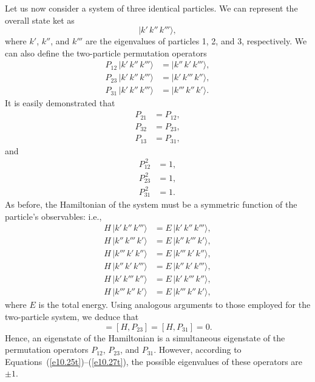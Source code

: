 Let us now consider a  system of three identical particles. We can represent the overall state ket as
\begin{equation}
|k'\,k''\,k'''\rangle,
\end{equation}
where $k'$, $k''$, and $k'''$ are the eigenvalues of particles 1, 2, and 3, respectively. We can also
define the two-particle permutation operators
\begin{align}
P_{12}\,|k'\,k''\,k'''\rangle &= |k''\,k'\,k'''\rangle,\\[0.5ex]
P_{23}\,|k'\,k''\,k'''\rangle &= |k'\,k'''\,k''\rangle,\\[0.5ex]
P_{31}\,|k'\,k''\,k'''\rangle &= |k'''\,k''\,k'\rangle.
\end{align}
It is easily demonstrated that
\begin{align}
P_{21}&= P_{12},\\[0.5ex]
P_{32}&= P_{23},\\[0.5ex]
P_{13}&= P_{31},
\end{align}
and
\begin{align}\label{e10.25t}
P_{12}^{\,2} &= 1,\\[0.5ex]
P_{23}^{\,2} &= 1,\\[0.5ex]
P_{31}^{\,2} &= 1.\label{e10.27t}
\end{align}
As before, the Hamiltonian of the system must be a symmetric function of the particle's observables: i.e.,
\begin{align}\label{e10.28t}
H\,|k'\,k''\,k'''\rangle &= E\,|k'\,k''\,k'''\rangle,\\[0.5ex]
H\,|k''\,k'''\,k'\rangle &= E\,|k''\,k'''\,k'\rangle,\\[0.5ex]
H\,|k'''\,k'\,k''\rangle &= E\,|k'''\,k'\,k''\rangle,\\[0.5ex]
H\,|k''\,k'\,k'''\rangle &= E\,|k''\,k'\,k'''\rangle,\\[0.5ex]
H\,|k'\,k'''\,k''\rangle &= E\,|k'\,k'''\,k''\rangle,\\[0.5ex]
H\,|k'''\,k''\,k'\rangle &= E\,|k'''\,k''\,k'\rangle,\label{e10.33t}
\end{align}
where $E$ is the total energy. 
Using analogous arguments to those employed for the two-particle system, 
we deduce that 
\begin{equation}
[H,P_{12}] = [H,P_{23}] = [H,P_{31}] = 0.
\end{equation}
Hence, an eigenstate of the Hamiltonian is a simultaneous eigenstate of the permutation operators $P_{12}$, $P_{23}$, and $P_{31}$. 
However, according to Equations~(\ref{e10.25t})--(\ref{e10.27t}), the possible eigenvalues of these operators are $\pm 1$. 

